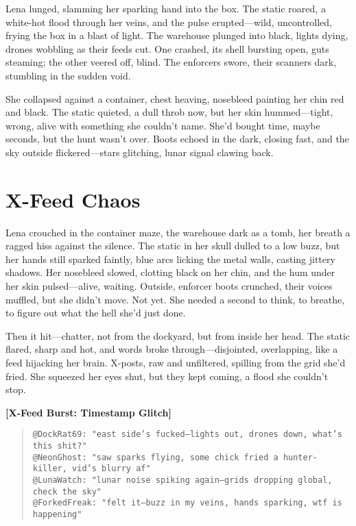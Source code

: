 \documentclass[12pt]{book}
\begin{document}
Lena lunged, slamming her sparking hand into the box. The static roared, a white-hot flood through her veins, and the pulse erupted—wild, uncontrolled, frying the box in a blast of light. The warehouse plunged into black, lights dying, drones wobbling as their feeds cut. One crashed, its shell bursting open, guts steaming; the other veered off, blind. The enforcers swore, their scanners dark, stumbling in the sudden void.

She collapsed against a container, chest heaving, nosebleed painting her chin red and black. The static quieted, a dull throb now, but her skin hummed—tight, wrong, alive with something she couldn’t name. She’d bought time, maybe seconds, but the hunt wasn’t over. Boots echoed in the dark, closing fast, and the sky outside flickered—stars glitching, lunar signal clawing back.

\section{X-Feed Chaos}

Lena crouched in the container maze, the warehouse dark as a tomb, her breath a ragged hiss against the silence. The static in her skull dulled to a low buzz, but her hands still sparked faintly, blue arcs licking the metal walls, casting jittery shadows. Her nosebleed slowed, clotting black on her chin, and the hum under her skin pulsed---alive, waiting. Outside, enforcer boots crunched, their voices muffled, but she didn’t move. Not yet. She needed a second to think, to breathe, to figure out what the hell she’d just done.

Then it hit---chatter, not from the dockyard, but from inside her head. The static flared, sharp and hot, and words broke through---disjointed, overlapping, like a feed hijacking her brain. X-posts, raw and unfiltered, spilling from the grid she’d fried. She squeezed her eyes shut, but they kept coming, a flood she couldn’t stop.

\bigskip
\noindent\textbf{[X-Feed Burst: Timestamp Glitch]}
\begin{quote}
\texttt{@DockRat69: "east side’s fucked---lights out, drones down, what’s this shit?"}\\[1ex]
\texttt{@NeonGhost: "saw sparks flying, some chick fried a hunter-killer, vid’s blurry af"}\\[1ex]
\texttt{@LunaWatch: "lunar noise spiking again---grids dropping global, check the sky"}\\[1ex]
\texttt{@ForkedFreak: "felt it---buzz in my veins, hands sparking, wtf is happening"}
\end{quote}
\bigskip
\end{document}
